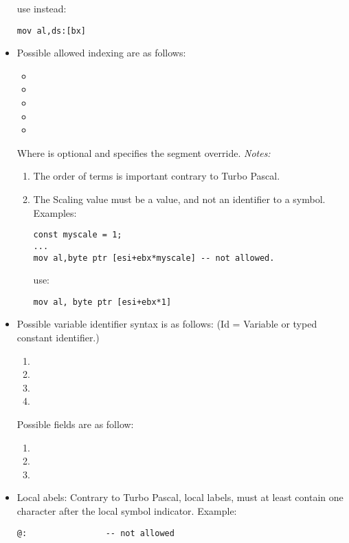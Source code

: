 \begin{itemize}
use instead:
\begin{verbatim}
mov al,ds:[bx]
\end{verbatim}
\item  Possible allowed indexing are as follows:
\begin{itemize}
\item    {}
\item    {}
\item    {}
\item    {}
\item    {}
\end{itemize}
Where  is optional and specifies the segment override.
{\em Notes:}
\begin{enumerate}
\item The order of terms is important contrary to Turbo Pascal.
\item The Scaling value must be a value, and not an identifier
to a symbol. Examples:
\begin{verbatim}
const myscale = 1;
...
mov al,byte ptr [esi+ebx*myscale] -- not allowed.
\end{verbatim}
use:
\begin{verbatim}
mov al, byte ptr [esi+ebx*1]
\end{verbatim}
\end{enumerate}
\item  Possible variable identifier syntax is as follows:
 (Id = Variable or typed constant identifier.)
\begin{enumerate}
\item {}
\item \var{[ID]}
\item \var{[ID+expr]}
\item {}
\end{enumerate}
 Possible fields are as follow:
\begin{enumerate}
\item  {}
\item  {}
\item  {}
\end{enumerate}
\item  Local abels: Contrary to Turbo Pascal, local labels, must
at least contain one character after the local symbol indicator.
Example:
\begin{verbatim}
@:                -- not allowed

\end{verbatim}
\end{itemize}
